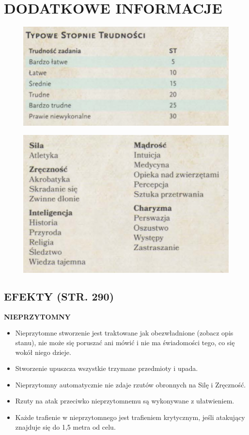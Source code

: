 \documentclass[14pt]{article}
\begin{document}
\newpage
\section*{DODATKOWE INFORMACJE}
\begin{figure}[h]
    \centering
    \includegraphics[width=1\textwidth]{test_sporny.png}
\end{figure}
\begin{figure}[h]
    \centering
    \includegraphics[width=1\textwidth]{umiejetnosci.png}
\end{figure}
\newpage

\subsection*{EFEKTY (STR. 290)}
\Centering
\textbf{NIEPRZYTOMNY}
\begin{itemize}
    \item Nieprzytomne stworzenie jest traktowane jak obezwładnione (zobacz opis stanu), nie może się poruszać ani mówić i nie ma świadomości tego, co się wokół niego dzieje.
    \item Stworzenie upuszcza wszystkie trzymane przedmioty i upada.
    \item Nieprzytomny automatycznie nie zdaje rzutów obronnych na Silę i Zręczność.
    \item Rzuty na atak przeciwko nieprzytomnemu są wykonywane z ułatwieniem.
    \item Każde trafienie w nieprzytomnego jest trafieniem krytycznym, jeśli atakujący znajduje się do 1,5 metra od celu.
\end{itemize}
\end{document}
